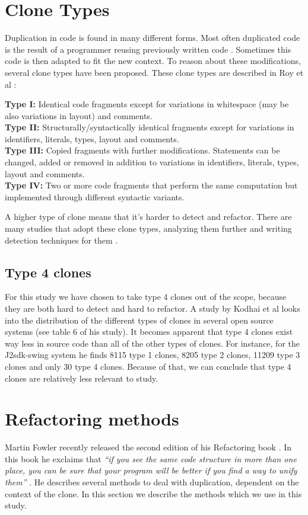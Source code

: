\section{Clone Types} \label{chap:backgroundclonetypes}
Duplication in code is found in many different forms. Most often duplicated code is the result of a programmer reusing previously written code \cite{haefliger2008code, baxter1998clone}. Sometimes this code is then adapted to fit the new context. To reason about these modifications, several clone types have been proposed. These clone types are described in Roy et al \cite{roy2007survey}:
\begin{displayquote}
\textbf{Type I:} Identical code fragments except for variations in whitespace (may be also variations in layout) and comments.\\
\textbf{Type II:} Structurally/syntactically identical fragments except for variations in identifiers, literals, types, layout and comments.\\
\textbf{Type III:} Copied fragments with further modifications. Statements can be changed, added or removed in addition to variations in identifiers, literals, types, layout and comments.\\
\textbf{Type IV:} Two or more code fragments that perform the same computation but implemented through different syntactic variants.
\end{displayquote}
A higher type of clone means that it's harder to detect and refactor. There are many studies that adopt these clone types, analyzing them further and writing detection techniques for them \cite{sajnani2016sourcerercc, kodhai2010detection, van2019novel}.

\subsection{Type 4 clones}
For this study we have chosen to take type 4 clones out of the scope, because they are both hard to detect and hard to refactor. A study by Kodhai et al \cite{kodhai2013method} looks into the distribution of the different types of clones in several open source systems (see table 6 of his study). It becomes apparent that type 4 clones exist way less in source code than all of the other types of clones. For instance, for the J2sdk-swing system he finds 8115 type 1 clones, 8205 type 2 clones, 11209 type 3 clones and only 30 type 4 clones. Because of that, we can conclude that type 4 clones are relatively less relevant to study.

\section{Refactoring methods}
Martin Fowler recently released the second edition of his Refactoring book \cite{fowler2018refactoring}. In this book he exclaims that \textit{``if you see the same code structure in more than one place, you can be sure that your program will be better if you find a way to unify them''} \cite{fowler1999refactoring, fowler2018refactoring}. He describes several methods to deal with duplication, dependent on the context of the clone. In this section we describe the methods which we use in this study.

